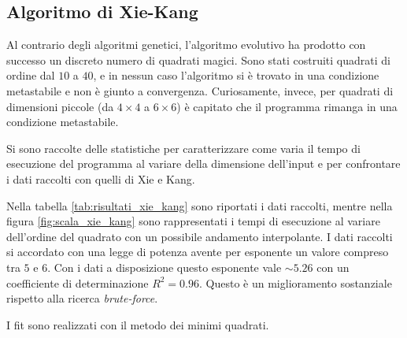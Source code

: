 \documentclass[italian,twoside,twocolumn]{article}
\begin{document}
\subsection{Algoritmo di Xie-Kang}
Al contrario degli algoritmi genetici, l'algoritmo evolutivo ha prodotto con successo un discreto numero di quadrati magici. Sono stati costruiti quadrati di ordine dal $ 10 $ a $ 40 $, e in nessun caso l'algoritmo si è trovato in una condizione metastabile e non è giunto a convergenza. Curiosamente, invece, per quadrati di dimensioni piccole (da $ 4\times 4 $ a $ 6\times6 $) è capitato che il programma rimanga in una condizione metastabile. 

Si sono raccolte delle statistiche per caratterizzare come varia il tempo di esecuzione del programma al variare della dimensione dell'input e per confrontare i dati raccolti con quelli di Xie e Kang. 

Nella tabella \ref{tab:risultati_xie_kang} sono riportati i dati raccolti, mentre nella figura \ref{fig:scala_xie_kang} sono rappresentati i tempi di esecuzione al variare dell'ordine del quadrato con un possibile andamento interpolante. I dati raccolti si accordato con una legge di potenza avente per esponente un valore compreso tra $ 5 $ e $ 6 $. Con i dati a disposizione questo esponente vale $ \sim \num{5.26} $ con un coefficiente di determinazione $ R^2 = \num{0.96} $. Questo è un miglioramento sostanziale rispetto alla ricerca \emph{brute-force}.

I fit sono realizzati con il metodo dei minimi quadrati.
\end{document}
